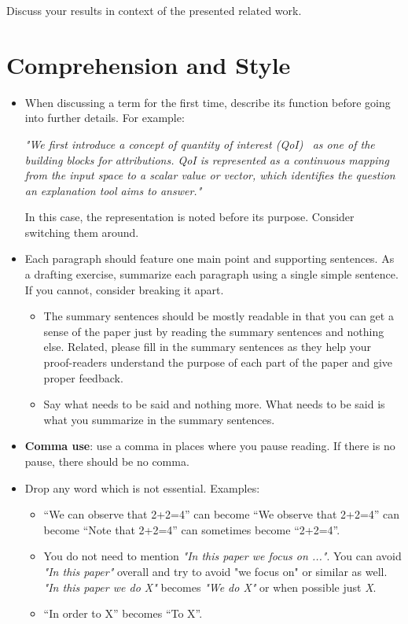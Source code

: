  Discuss your results in context of the presented related work.


\section{Comprehension and Style}

\begin{itemize}
\item{} When discussing a term for the first time, describe its function before going into further
  details. For example:

  \textit{"We first introduce a concept of \textit{quantity of interest}
    (QoI)~\cite{leino2018influence} as one of the building blocks for attributions. QoI is
    represented as a continuous mapping from the input space to a scalar value or vector, which
    identifies the question an explanation tool aims to answer."}

  In this case, the representation is noted before its purpose. Consider switching them around.

\item{} Each paragraph should feature one main point and supporting sentences. As a drafting
  exercise, summarize each paragraph using a single simple sentence. If you cannot, consider
  breaking it apart.

  \begin{itemize}
    \item{} The summary sentences should be mostly readable in that you can get a sense of the
      paper just by reading the summary sentences and nothing else. Related, please fill in the
      summary sentences as they help your proof-readers understand the purpose of each part of the
      paper and give proper feedback.
    \item{} Say what needs to be said and nothing more. What needs to be said is what you summarize
      in the summary sentences.
  \end{itemize}

\item{} \textbf{Comma use}: use a comma in places where you pause reading. If there is no pause,
  there should be no comma.

\item{} Drop any word which is not essential. Examples:
  \begin{itemize}
  \item{} ``We can observe that 2+2=4'' can become ``We observe that 2+2=4'' can become ``Note that
    2+2=4'' can sometimes become ``2+2=4''.
  \item{} You do not need to mention \textit{"In this paper we focus on ..."}. You can avoid
    \textit{"In this paper"} overall and try to avoid "we focus on" or similar as well. \textit{"In
      this paper we do X"} becomes \textit{"We do X"} or when possible just \textit{X}.
  \item{} ``In order to X'' becomes ``To X''.
  \end{itemize}
\end{itemize}

